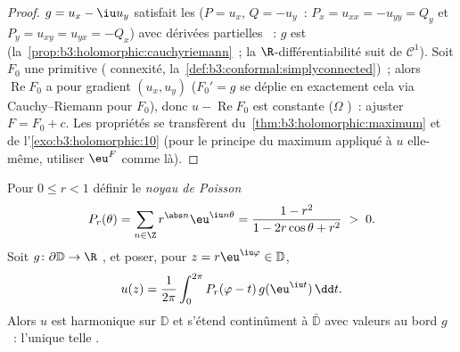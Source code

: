 \begin{proof}
$g = u_x - \iu u_y$ satisfait les  ($P = u_x$, $Q = -u_y$~: $P_x = u_{xx} =
-u_{yy} = Q_y$ et $P_y = u_{xy} = u_{yx} = -Q_x$) avec
dérivées partielles ~: $g$ est 
(la~\cref{prop:b3:holomorphic:cauchyriemann}~; la
$\R$-différentiabilité suit de $\mathcal C^1$). Soit $F_0$
une primitive ( connexité,
la~\cref{def:b3:conformal:simplyconnected})~; alors
$\operatorname{Re}F_0$ a pour gradient $(u_x, u_y)$
($F_0' = g$ se déplie en exactement cela via Cauchy--Riemann
pour $F_0$), donc $u - \operatorname{Re}F_0$ est constante
($\Omega$ )~: ajuster $F = F_0 + c$. Les propriétés
se transfèrent du~\cref{thm:b3:holomorphic:maximum} et de
l'\cref{exo:b3:holomorphic:10} (pour le principe du maximum
appliqué à $u$ elle-même, utiliser $\eu^{F}$ comme là).
\end{proof}

\begin{theorem}\label{thm:b3:conformal:poisson}
Pour $0 \leq r < 1$ définir le \emph{noyau de
Poisson}
\[
P_r(\theta) = \sum_{n\in\Z}r^{\abs n}\eu^{\iu n\theta}
= \frac{1 - r^2}{1 - 2r\cos\theta + r^2} \;>\; 0 .
\]
Soit $g \colon \partial\mathbb D \to \R$ , et poser,
pour $z = r\eu^{\iu\varphi} \in \mathbb D$,
\[
u(z) = \frac1{2\pi}\int_0^{2\pi}
P_r(\varphi - t)\,g(\eu^{\iu t})\,\dd t .
\]
Alors $u$ est harmonique sur $\mathbb D$ et s'étend
continûment à $\bar{\mathbb D}$ avec valeurs au bord $g$~:
l'unique telle .
\end{theorem}

